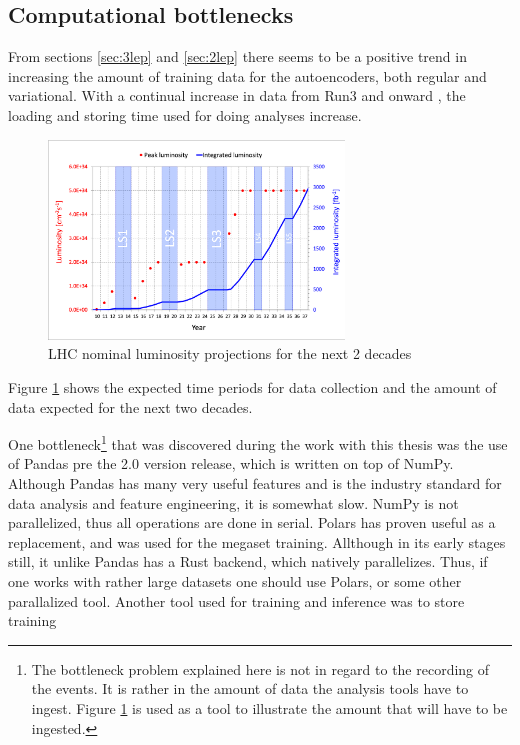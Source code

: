 \subsection*{Computational bottlenecks}
From sections \ref{sec:3lep} and \ref{sec:2lep} there seems to be a positive trend in increasing the amount 
of training data for the autoencoders, both regular and variational. With a continual increase in data from 
Run3 and onward \cite{LHC_int_lum}, the loading and storing time used for doing analyses increase. 

\begin{figure}[H]
    \caption[LHC nominal luminosity projections]{LHC nominal luminosity projections for the next 2 decades}
    \label{fig:lhc_nom}
    \centering
    \includegraphics[width=0.7\textwidth]{Figures/atlas/LHC-nominal-lumi-projection.png}
\end{figure}
Figure \ref{fig:lhc_nom} shows the expected time periods for data collection and the amount of data expected for 
the next two decades. \par
One bottleneck\footnote{The bottleneck problem explained here is not in regard to the recording of the events. 
It is rather in the amount of data the analysis tools have to ingest. Figure \ref{fig:lhc_nom} is used as a tool
to illustrate the amount that will have to be ingested. } that was discovered during the work with this thesis was 
the use of Pandas pre the 2.0 version release, which is 
written on top of NumPy. Although Pandas has many very useful features and is the industry standard for 
data analysis and feature engineering, it is somewhat slow. NumPy is not parallelized, thus all operations are 
done in serial. Polars has proven useful as a replacement, and was used for the megaset training. Allthough in its 
early stages still, it unlike Pandas has a Rust backend, which natively parallelizes. Thus, if one works with rather 
large datasets one should use
Polars, or some other parallalized tool. Another tool used for training and inference was to store training 
